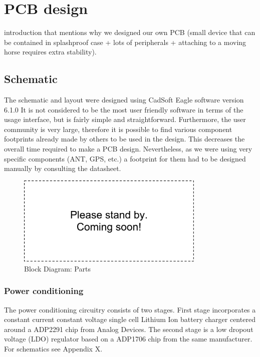 \chapter{PCB design}
\TODO{} introduction that mentions why we designed our own PCB (small device that can be contained in splashproof case + lots of peripherals + attaching to a moving horse requires extra stability).


\section{Schematic}
The schematic and layout were designed using CadSoft Eagle software version 6.1.0 It is not considered to be the most user friendly software in terms of the usage interface, but is fairly simple and straightforward. Furthermore, the user community is very large, therefore it is possible to find various component footprints already made by others to be used in the design. This decreases the overall time required to make a PCB design. Nevertheless, as we were using very specific components  (ANT, GPS, etc.) a footprint for them had to be designed manually by consulting the datasheet. 

\begin{figure}
\centering
\includegraphics[width=0.8\textwidth]{Images/dummy}
\caption{Block Diagram: Parts}
\label{fig:block_parts}
\end{figure}

\subsection{Power conditioning}
The power conditioning circuitry consists of two stages. First stage incorporates a constant current constant voltage single cell Lithium Ion battery charger centered around a ADP2291 chip from Analog Devices.  The second stage is a low dropout voltage (LDO) regulator based on a ADP1706 chip from the same manufacturer. For schematics see Appendix X. 


